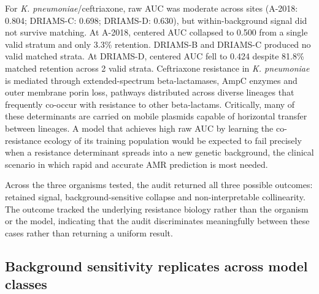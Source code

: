 \documentclass[11pt]{article}
\begin{document}
For \textit{K. pneumoniae}/ceftriaxone, raw AUC was moderate across sites (A-2018: 0.804; DRIAMS-C: 0.698; DRIAMS-D: 0.630), but within-background signal did not survive matching. At A-2018, centered AUC collapsed to 0.500 from a single valid stratum and only 3.3\% retention. DRIAMS-B and DRIAMS-C produced no valid matched strata. At DRIAMS-D, centered AUC fell to 0.424 despite 81.8\% matched retention across 2 valid strata. Ceftriaxone resistance in \textit{K. pneumoniae} is mediated through extended-spectrum beta-lactamases, AmpC enzymes and outer membrane porin loss, pathways distributed across diverse lineages that frequently co-occur with resistance to other beta-lactams. Critically, many of these determinants are carried on mobile plasmids capable of horizontal transfer between lineages. A model that achieves high raw AUC by learning the co-resistance ecology of its training population would be expected to fail precisely when a resistance determinant spreads into a new genetic background, the clinical scenario in which rapid and accurate AMR prediction is most needed.

Across the three organisms tested, the audit returned all three possible outcomes: retained signal, background-sensitive collapse and non-interpretable collinearity. The outcome tracked the underlying resistance biology rather than the organism or the model, indicating that the audit discriminates meaningfully between these cases rather than returning a uniform result.

\subsection*{Background sensitivity replicates across model classes}
\end{document}
